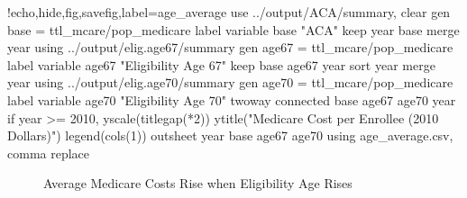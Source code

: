 \documentclass{article}
\begin{document}
\begin{table}[ht]
\centering
\caption{Net Present Value of Eligibility Age Options Less Net Present Value of ACA (Billions of 2010 Dollars)}
\label{tab:age_c_cost}
\end{table}

\begin{Statacode}{!echo,hide,fig,savefig,label=age_average}
use ../output/ACA/summary, clear
gen base = ttl_mcare/pop_medicare
label variable base "ACA"
keep year base
merge year using ../output/elig.age67/summary
gen age67 = ttl_mcare/pop_medicare
label variable age67 "Eligibility Age 67"
keep base age67 year
sort year
merge year using ../output/elig.age70/summary
gen age70 = ttl_mcare/pop_medicare
label variable age70 "Eligibility Age 70"
twoway connected base age67 age70 year if year >= 2010, yscale(titlegap(*2)) ytitle("Medicare Cost per Enrollee (2010 Dollars)") legend(cols(1))
outsheet year base age67 age70 using age_average.csv, comma replace
\end{Statacode}

\begin{figure}[ht]
\centering
{}
\caption{Average Medicare Costs Rise when Eligibility Age Rises}
\label{fig:age_average}
\end{figure}
\end{document}
